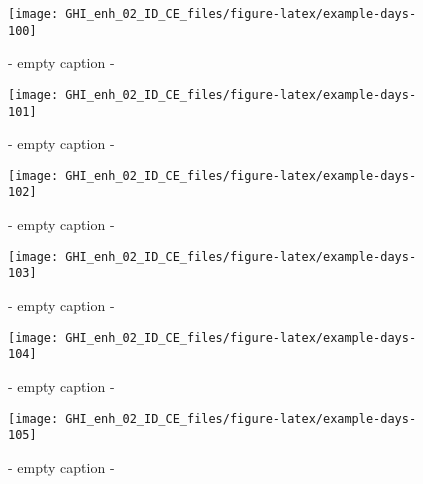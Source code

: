 \documentclass[
  10pt,
  a4paper,oneside]{article}
\begin{document}
\begin{figure}[H]

{\centering \texttt{[image: GHI\_enh\_02\_ID\_CE\_files/figure-latex/example-days-100]} 

}

\caption{ - empty caption - }\label{fig:example-days-100}
\end{figure}

\begin{figure}[H]

{\centering \texttt{[image: GHI\_enh\_02\_ID\_CE\_files/figure-latex/example-days-101]} 

}

\caption{ - empty caption - }\label{fig:example-days-101}
\end{figure}

\begin{figure}[H]

{\centering \texttt{[image: GHI\_enh\_02\_ID\_CE\_files/figure-latex/example-days-102]} 

}

\caption{ - empty caption - }\label{fig:example-days-102}
\end{figure}

\begin{figure}[H]

{\centering \texttt{[image: GHI\_enh\_02\_ID\_CE\_files/figure-latex/example-days-103]} 

}

\caption{ - empty caption - }\label{fig:example-days-103}
\end{figure}

\begin{figure}[H]

{\centering \texttt{[image: GHI\_enh\_02\_ID\_CE\_files/figure-latex/example-days-104]} 

}

\caption{ - empty caption - }\label{fig:example-days-104}
\end{figure}

\begin{figure}[H]

{\centering \texttt{[image: GHI\_enh\_02\_ID\_CE\_files/figure-latex/example-days-105]} 

}

\caption{ - empty caption - }\label{fig:example-days-105}
\end{figure}
\end{document}
